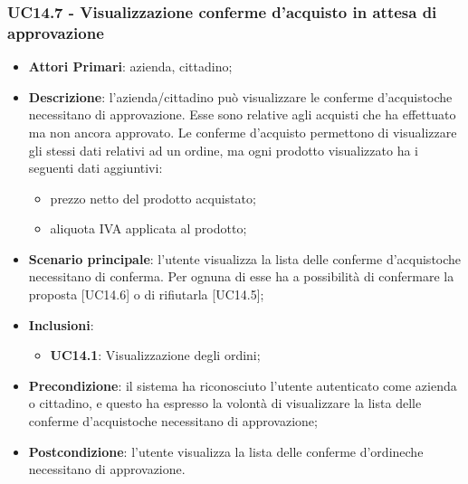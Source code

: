 \subsubsection{UC14.7 - Visualizzazione conferme d'acquisto in attesa di approvazione}
\begin{itemize}
	\item \textbf{Attori Primari}: azienda, cittadino;
	\item \textbf{Descrizione}: l'azienda/cittadino può visualizzare le conferme d'acquisto\glosp che necessitano di approvazione. Esse sono relative agli acquisti che ha effettuato ma non ancora approvato. Le conferme d'acquisto permettono di visualizzare gli stessi dati relativi ad un ordine, ma ogni prodotto visualizzato ha i seguenti dati aggiuntivi:
	\begin{itemize}
		\item prezzo netto del prodotto acquistato;	
		\item aliquota IVA applicata al prodotto;
	\end{itemize}
	\item \textbf{Scenario principale}: l'utente visualizza la lista delle conferme d'acquisto\glosp che necessitano di conferma. Per ognuna di esse ha a possibilità di confermare la proposta [UC14.6] o di rifiutarla [UC14.5];
	\item \textbf{Inclusioni}:
	\begin{itemize}
		\item \textbf{UC14.1}: Visualizzazione degli ordini;
	\end{itemize}
	\item \textbf{Precondizione}: il sistema ha riconosciuto l'utente autenticato come azienda o cittadino, e questo ha espresso la volontà di visualizzare la lista delle conferme d'acquisto\glosp che necessitano di approvazione;
	\item \textbf{Postcondizione}: l'utente visualizza la lista delle conferme d'ordine\glosp che necessitano di approvazione.
\end{itemize}





